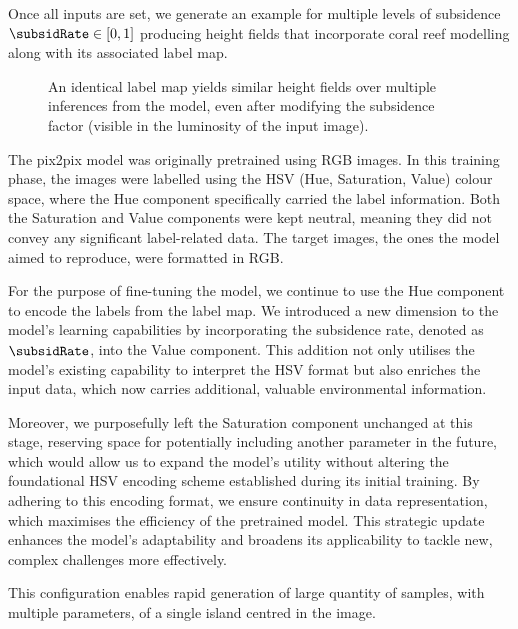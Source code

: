 Once all inputs are set, we generate an example for multiple levels of subsidence $\subsidRate \in [0, 1]$ producing height fields that incorporate coral reef modelling along with its associated label map.

\begin{figure}
    \caption[Multiple islands generated with two subsidence values]{An identical label map yields similar height fields over multiple inferences from the model, even after modifying the subsidence factor (visible in the luminosity of the input image).}
    \label{fig:coral-island-results-subsidence}
\end{figure}

The pix2pix model was originally pretrained using RGB images. In this training phase, the images were labelled using the HSV (Hue, Saturation, Value) colour space, where the Hue component specifically carried the label information. Both the Saturation and Value components were kept neutral, meaning they did not convey any significant label-related data. The target images, the ones the model aimed to reproduce, were formatted in RGB.

For the purpose of fine-tuning the model, we continue to use the Hue component to encode the labels from the label map. We introduced a new dimension to the model's learning capabilities by incorporating the subsidence rate, denoted as $\subsidRate$, into the Value component. This addition not only utilises the model's existing capability to interpret the HSV format but also enriches the input data, which now carries additional, valuable environmental information.

Moreover, we purposefully left the Saturation component unchanged at this stage, reserving space for potentially including another parameter in the future, which would allow us to expand the model's utility without altering the foundational HSV encoding scheme established during its initial training. By adhering to this encoding format, we ensure continuity in data representation, which maximises the efficiency of the pretrained model. This strategic update enhances the model's adaptability and broadens its applicability to tackle new, complex challenges more effectively.

This configuration enables rapid generation of large quantity of samples, with multiple parameters, of a single island centred in the image.

